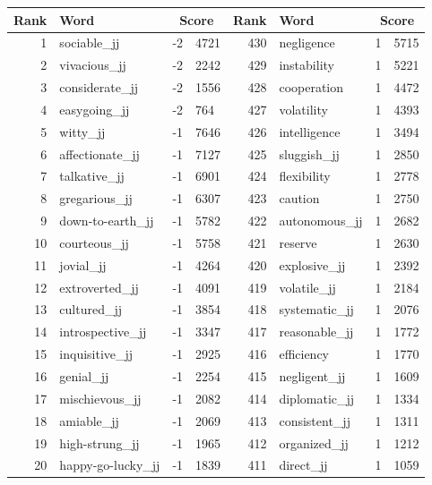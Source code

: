 \begin{table}[tbp]
    \begin{tabular}{| rlr@{.}l | rlr@{.}l |}
    \hline
    \textbf{Rank} & \textbf{Word} & \multicolumn{2}{c|}{\textbf{Score}} & \textbf{Rank} & \textbf{Word} & \multicolumn{2}{c|}{\textbf{Score}} \\
    \hline
    1 & sociable\_jj & -2 & 4721    &    430 & negligence & 1 & 5715 \\
    2 & vivacious\_jj & -2 & 2242    &    429 & instability & 1 & 5221 \\
    3 & considerate\_jj & -2 & 1556    &    428 & cooperation & 1 & 4472 \\
    4 & easygoing\_jj & -2 & 764    &    427 & volatility & 1 & 4393 \\
    5 & witty\_jj & -1 & 7646    &    426 & intelligence & 1 & 3494 \\
    6 & affectionate\_jj & -1 & 7127    &    425 & sluggish\_jj & 1 & 2850 \\
    7 & talkative\_jj & -1 & 6901    &    424 & flexibility & 1 & 2778 \\
    8 & gregarious\_jj & -1 & 6307    &    423 & caution & 1 & 2750 \\
    9 & down-to-earth\_jj & -1 & 5782    &    422 & autonomous\_jj & 1 & 2682 \\
    10 & courteous\_jj & -1 & 5758    &    421 & reserve & 1 & 2630 \\
    11 & jovial\_jj & -1 & 4264    &    420 & explosive\_jj & 1 & 2392 \\
    12 & extroverted\_jj & -1 & 4091    &    419 & volatile\_jj & 1 & 2184 \\
    13 & cultured\_jj & -1 & 3854    &    418 & systematic\_jj & 1 & 2076 \\
    14 & introspective\_jj & -1 & 3347    &    417 & reasonable\_jj & 1 & 1772 \\
    15 & inquisitive\_jj & -1 & 2925    &    416 & efficiency & 1 & 1770 \\
    16 & genial\_jj & -1 & 2254    &    415 & negligent\_jj & 1 & 1609 \\
    17 & mischievous\_jj & -1 & 2082    &    414 & diplomatic\_jj & 1 & 1334 \\
    18 & amiable\_jj & -1 & 2069    &    413 & consistent\_jj & 1 & 1311 \\
    19 & high-strung\_jj & -1 & 1965    &    412 & organized\_jj & 1 & 1212 \\
    20 & happy-go-lucky\_jj & -1 & 1839    &    411 & direct\_jj & 1 & 1059 \\

\end{tabular}
\end{table}

